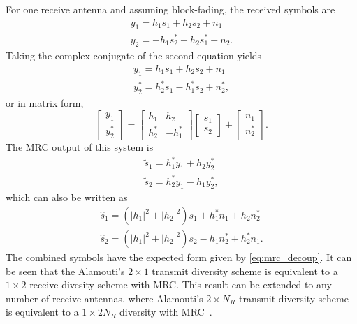 For one receive antenna and assuming block-fading, the received symbols are
\begin{gather*}
  y_1 = h_1 s_1 + h_2 s_2 + n_1 \\
  y_2 = -h_1 s_2^\ast + h_2 s_1^\ast + n_2.
\end{gather*}
Taking the complex conjugate of the second equation yields
\begin{gather*}
  y_1 = h_1 s_1 + h_2 s_2 + n_1 \\
  y_2^\ast = h_2^\ast s_1 - h_1^\ast s_2 + n_2^\ast,
\end{gather*}
or in matrix form,
\[ \begin{bmatrix} y_1 \\ y_2^\ast \end{bmatrix} =
\begin{bmatrix} h_1 & h_2 \\ h_2^\ast & -h_1^\ast \end{bmatrix}
\begin{bmatrix} s_1 \\ s_2 \end{bmatrix} + \begin{bmatrix} n_1 \\ n_2^\ast \end{bmatrix}. \]
The MRC output of this system is
\begin{gather*}
  \tilde{s}_1 = h_1^\ast y_1 + h_2 y_2^\ast \\
  \tilde{s}_2 = h_2^\ast y_1 - h_1 y_2^\ast,
\end{gather*}
which can also be written as
\begin{gather*}
  \hat{s}_1 = (|h_1|^2+|h_2|^2) s_1 + h_1^\ast n_1 + h_2 n_2^\ast \\
  \hat{s}_2 = (|h_1|^2+|h_2|^2) s_2 - h_1 n_2^\ast + h_2^\ast n_1.
\end{gather*}
The combined symbols have the expected form given by \eqref{eq:mrc_decoup}. It can be seen that the Alamouti's $2\times1$ transmit diversity scheme is equivalent to a $1\times2$ receive divesity scheme with MRC. This result can be extended to any number of receive antennas, where Alamouti's $2\times N_R$ transmit diversity scheme is equivalent to a $1\times 2N_R$ diversity with MRC~\cite{stuber12}.

